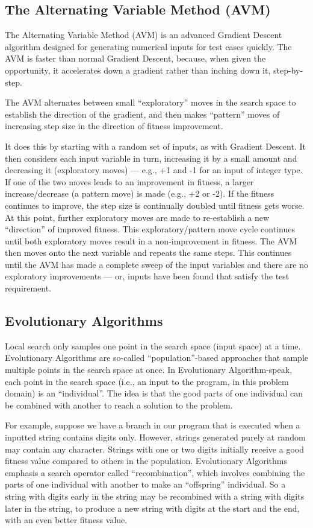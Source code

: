 \subsection{The Alternating Variable Method (AVM)}

The Alternating Variable Method (AVM) is an advanced Gradient Descent algorithm
designed for generating numerical inputs for test cases quickly. The AVM is
faster than normal Gradient Descent, because, when given the opportunity, it
accelerates down a gradient rather than inching down it, step-by-step. 

The AVM alternates between small ``exploratory'' moves in the search space to
establish the direction of the gradient, and then makes ``pattern'' moves of
increasing step size in the direction of fitness improvement. 

It does this by starting with a random set of inputs, as with Gradient Descent.
It then considers each input variable in turn, increasing it by a small amount
and decreasing it (exploratory moves) --- e.g., +1 and -1 for an input of
integer type. If one of the two moves leads to an improvement in fitness, a
larger increase/decrease (a pattern move) is made (e.g., +2 or -2). If the
fitness continues to improve, the step size is continually doubled until fitness
gets worse. At this point, further exploratory moves are made to re-establish a
new ``direction'' of improved fitness. This exploratory/pattern move cycle
continues until both exploratory moves result in a non-improvement in fitness.
The AVM then moves onto the next variable and repeats the same steps. This
continues until the AVM has made a complete sweep of the input variables and
there are no exploratory improvements --- or, inputs have been found that
satisfy the test requirement.

\subsection{Evolutionary Algorithms}

Local search only samples one point in the search space (input space) at a time.
Evolutionary Algorithms are so-called ``population''-based approaches that
sample multiple points in the search space at once. In Evolutionary
Algorithm-speak, each point in the search space (i.e., an input to the program,
in this problem domain) is an ``individual''. The idea is that the good parts of
one individual can be combined with another to reach a solution to the problem. 

For example, suppose we have a branch in our program that is executed when a
inputted string contains digits only. However, strings generated purely at
random may contain any character. Strings with one or two digits initially
receive a good fitness value compared to others in the population. Evolutionary
Algorithms emphasis a search operator called ``recombination'', which involves
combining the parts of one individual with another to make an ``offspring''
individual. So a string with digits early in the string may be recombined with a
string with digits later in the string, to produce a new string with digits at
the start and the end, with an even better fitness value. 

